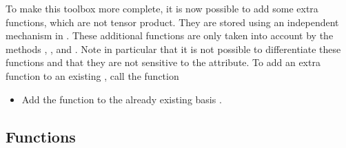 To make this toolbox more complete, it is now possible to add some extra functions, which are not tensor product. They are stored using an independent mechanism in .  These additional functions are only taken into account by the methods , ,  and . Note in particular that it is not possible to differentiate these functions and that they are not sensitive to the  attribute. To add an extra function to an existing , call the function
\begin{itemize}
  \item {}
  \sshortdescribe Add the function  to the already existing basis .
\end{itemize}

\subsection{Functions}

